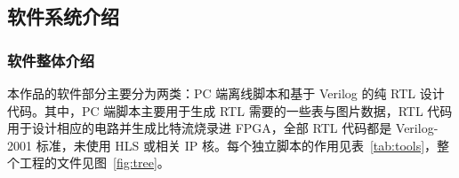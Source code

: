 \documentclass[withoutpreface,bwprint]{cumcmthesis}
\begin{document}
\subsection{软件系统介绍}

\subsubsection{软件整体介绍}

本作品的软件部分主要分为两类：PC 端离线脚本和基于 Verilog 的纯 RTL 设计代码。其中，PC 端脚本主要用于生成 RTL 需要的一些表与图片数据，RTL 代码用于设计相应的电路并生成比特流烧录进 FPGA，全部 RTL 代码都是 Verilog-2001 标准，未使用 HLS 或相关 IP 核。每个独立脚本的作用见表~\ref{tab:tools}，整个工程的文件见图~\ref{fig:tree}。

%
\end{document}
